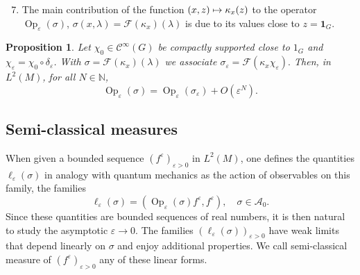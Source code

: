 \documentclass[10pt]{amsart}
\let\mathcal\mathscr
\newcommand\mto{\mathchoice{\longmapsto}{\mapsto}{\mapsto}{\mapsto}}
\newcommand{\bun}{\mathbf{1}}
\DeclareMathOperator{\Op}{Op}
\theoremstyle{plain}
\newtheorem{proposition}[theorem]{Proposition}
\theoremstyle{definition}
\let\eps\varepsilon
\def\N{{\mathbb N}}
\begin{document}
\begin{enumerate}\setcounter{enumi}{6}
\item\label{fact:7}
The main contribution of the function $(x,z)\mto \kappa_x (z)$ to the operator $\Op_\eps(\sigma)$, $\sigma(x,\lambda)=\mathcal F (\kappa_x) (\lambda) $ is due to its values close to $z=\bun_G$.
\end{enumerate}

\begin{proposition} \label{prop:cutoffkernel}
Let $\chi_0\in{\mathcal C}^\infty(G)$ be compactly supported close to $1_G$ and $\chi_\eps=\chi_0\circ \delta_\eps$. With $\sigma =\mathcal F (\kappa_x) (\lambda) $ we associate
$\sigma_\eps = \mathcal F (\kappa_x \chi_\eps).$
Then, in $L^2(M)$, for all $N\in\N$,
\[
\Op_\eps (\sigma)=\Op_\eps (\sigma_\eps) +O(\eps^{N}).
\]
\end{proposition}

\subsection{Semi-classical measures}\label{s:sclmeas}
When given a bounded sequence $(f^\eps)_{\eps>0}$ in $L^2(M)$, one defines the quantities $\ell_\eps(\sigma)$ in analogy with quantum mechanics as the action of observables on this family, \ie the families
\[
\ell_\eps(\sigma)= \left(\Op_\eps(\sigma) f^\eps,f^\eps\right),\quad \sigma\in \mathcal A_0.
\]
Since these quantities are bounded sequences of real numbers, it is then natural to study the asymptotic $\eps\to 0$. The families $(\ell_\eps(\sigma))_{\eps>0}$ have weak limits that depend linearly on $\sigma$ and enjoy additional properties. We call semi-classical measure of $(f^\eps)_{\eps>0}$ any of these linear forms.
\end{document}

